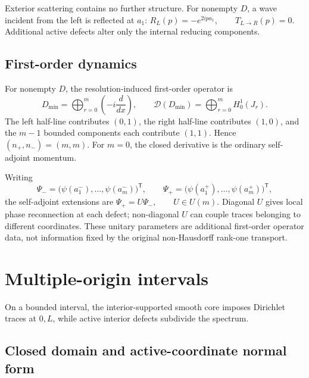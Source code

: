 \documentclass[11pt]{article}
\theoremstyle{plain}
\theoremstyle{definition}
\begin{document}
Exterior scattering contains no further structure. For nonempty \(D\), a
wave incident from the left is reflected at \(a_1\):
\(R_L(p)=-e^{2ipa_1}, \qquad T_{L\to R}(p)=0\).
Additional active defects alter only the internal reducing components.

\subsection{First-order dynamics}
\label{subsec:multisplit-first-order}

For nonempty \(D\), the resolution-induced first-order operator is
\[
  D_{\min}
  =
  \bigoplus_{r=0}^{m}
  \left(
    -i\frac{d}{dx}
  \right),
  \qquad
  \mathcal D(D_{\min})
  =
  \bigoplus_{r=0}^{m}H^1_0(J_r).
\]
The left half-line contributes \((0,1)\), the right half-line contributes
\((1,0)\), and the \(m-1\) bounded components each contribute \((1,1)\).
Hence
\((n_+,n_-)=(m,m)\).
For \(m=0\), the closed derivative is the ordinary self-adjoint momentum.

Writing
\[
  \Psi_-
  =
  \bigl(
    \psi(a_1^-),\ldots,\psi(a_m^-)
  \bigr)^{\mathsf T},
  \qquad
  \Psi_+
  =
  \bigl(
    \psi(a_1^+),\ldots,\psi(a_m^+)
  \bigr)^{\mathsf T},
\]
the self-adjoint extensions are
\(\Psi_+=U\Psi_-, \qquad U\in U(m)\).
Diagonal \(U\) gives local phase reconnection at each defect; non-diagonal
\(U\) can couple traces belonging to different coordinates. These unitary
parameters are additional first-order operator data, not information fixed
by the original non-Hausdorff rank-one transport.

\section{Multiple-origin intervals}
\label{sec:multiple-origin-intervals}

On a bounded interval, the interior-supported smooth core imposes Dirichlet traces at \(0,L\), while active interior defects subdivide the spectrum.

\subsection{Closed domain and active-coordinate normal form}
\label{subsec:multiinterval-H1}
\end{document}
